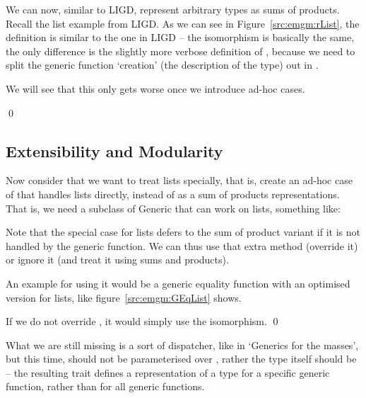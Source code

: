 \begin{example}
We can now, similar to  LIGD, represent arbitrary types as sums of products.
Recall the list example from LIGD.
As we can see in Figure~\ref{src:emgm:rList}, the definition is similar to
the one in LIGD
-- the isomorphism is basically the same, the only difference is the slightly
more verbose definition of , because we need to split the generic
function `creation' (the description of the type) out in .

We will see that this only gets worse once we introduce ad-hoc cases.

\qed{}
\end{example}

\subsection{Extensibility and Modularity}
Now consider that we want to treat lists specially, that is, create an
ad-hoc case of  that handles lists directly, instead of as a
sum of products representations. That is, we need a subclass of Generic
that can work on lists, something like:

Note that the special case for lists defers to the sum of product variant
if it is not handled by the generic function. We can thus use that extra
method (override it) or ignore it (and treat it using sums and products).

\begin{example}
An example for using it would be a generic equality function with an optimised
version for lists, like figure~\ref{src:emgm:GEqList} shows.

If we do not override , it would simply use the isomorphism. \qed
\end{example}

What we are still missing is a sort of dispatcher, like  in `Generics
for the masses', but this time,  should not be parameterised over ,
rather the type itself should be -- the resulting  trait defines a
representation of a type for a specific generic function, rather than for all
generic functions.


